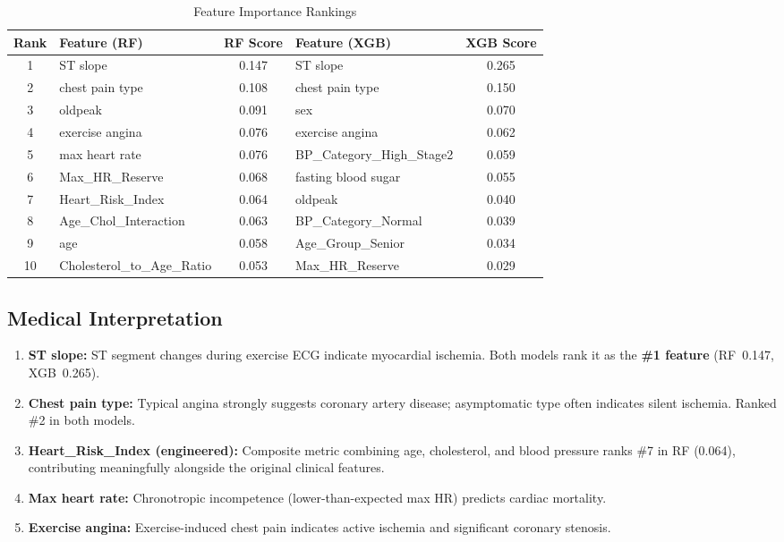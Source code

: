 \documentclass[12pt,a4paper]{article}
\begin{document}
\begin{table}[H]
\centering
\caption{Feature Importance Rankings}
\begin{tabular}{|c|l|c|l|c|}
\hline
\textbf{Rank} & \textbf{Feature (RF)} & \textbf{RF Score} & \textbf{Feature (XGB)} & \textbf{XGB Score} \\
\hline
1 & ST slope & 0.147 & ST slope & 0.265 \\
2 & chest pain type & 0.108 & chest pain type & 0.150 \\
3 & oldpeak & 0.091 & sex & 0.070 \\
4 & exercise angina & 0.076 & exercise angina & 0.062 \\
5 & max heart rate & 0.076 & BP\_Category\_High\_Stage2 & 0.059 \\
6 & Max\_HR\_Reserve & 0.068 & fasting blood sugar & 0.055 \\
7 & Heart\_Risk\_Index & 0.064 & oldpeak & 0.040 \\
8 & Age\_Chol\_Interaction & 0.063 & BP\_Category\_Normal & 0.039 \\
9 & age & 0.058 & Age\_Group\_Senior & 0.034 \\
10 & Cholesterol\_to\_Age\_Ratio & 0.053 & Max\_HR\_Reserve & 0.029 \\
\hline
\end{tabular}
\end{table}

\subsection{Medical Interpretation}

\begin{enumerate}
    \item \textbf{ST slope:} ST segment changes during exercise ECG indicate myocardial ischemia. Both models rank it as the \textbf{\#1 feature} (RF~0.147, XGB~0.265).
    \item \textbf{Chest pain type:} Typical angina strongly suggests coronary artery disease; asymptomatic type often indicates silent ischemia.  Ranked \#2 in both models.
    \item \textbf{Heart\_Risk\_Index (engineered):} Composite metric combining age, cholesterol, and blood pressure ranks \#7 in RF (0.064), contributing meaningfully alongside the original clinical features.
    \item \textbf{Max heart rate:} Chronotropic incompetence (lower-than-expected max HR) predicts cardiac mortality.
    \item \textbf{Exercise angina:} Exercise-induced chest pain indicates active ischemia and significant coronary stenosis.
\end{enumerate}
\end{document}
